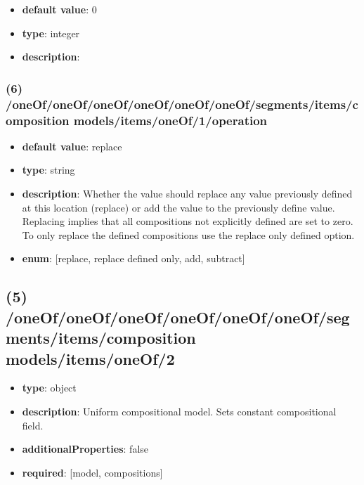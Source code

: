 \begin{itemize}[leftmargin=7em]\item {\bf default value}: 0
\item {\bf type}: integer
\item {\bf description}: 
\end{itemize}\subsubsection{(6) /oneOf/oneOf/oneOf/oneOf/oneOf/oneOf/segments/items/composition models/items/oneOf/1/operation}
\begin{itemize}[leftmargin=6em]\item {\bf default value}: replace
\item {\bf type}: string
\item {\bf description}: Whether the value should replace any value previously defined at this location (replace) or add the value to the previously define value. Replacing implies that all compositions not explicitly defined are set to zero. To only replace the defined compositions use the replace only defined option.
\item {\bf enum}: [replace, replace defined only, add, subtract]\end{itemize}\subsection{(5) /oneOf/oneOf/oneOf/oneOf/oneOf/oneOf/segments/items/composition models/items/oneOf/2}
\begin{itemize}[leftmargin=5em]\item {\bf type}: object
\item {\bf description}: Uniform compositional model. Sets constant compositional field.
\item {\bf additionalProperties}: false
\item {\bf required}: [model, compositions]\end{itemize}

